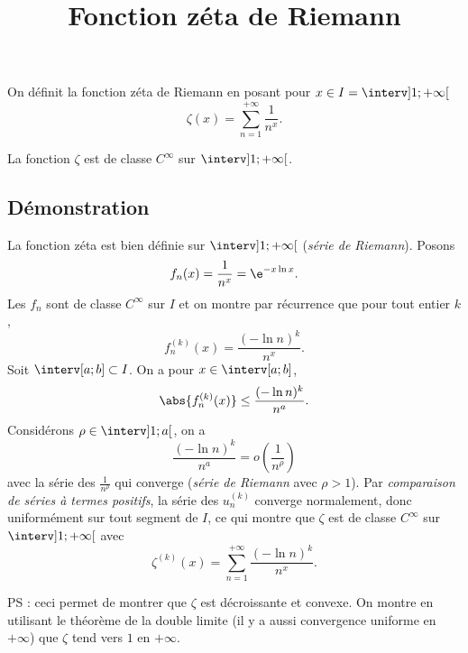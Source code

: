 \documentclass[fontsize=12pt,twoside=false,parskip=half, french]{scrartcl}
\title{Fonction zéta de Riemann}
\date{}
\author{}
\begin{document}
\maketitle
    On définit la fonction zéta de Riemann en posant pour $x \in I = \interv]1; +\infty[$
    \[
      \zeta(x) = \sum_{n = 1}^{+\infty} \frac{1}{n^x}.
    \]
   \begin{Theoreme}
      La fonction $\zeta$ est de classe $C^\infty$ sur $\interv]1; +\infty[$.
   \end{Theoreme}
   \subsection{Démonstration}
      La fonction zéta est bien définie sur $\interv]1; +\infty[$ (\emph{série de Riemann}). Posons
      \[
         f_n(x) = \frac{1}{n^x} = \e^{-x \ln x}.
      \]
      Les $f_n$ sont de classe $C^\infty$ sur $I$ et on montre par récurrence que pour tout entier $k$, 
      \[
         f_n^{(k)}(x) = \frac{(- \ln n)^k}{n^x}.
      \]
      Soit $\interv[a; b] \subset I$. On a pour $x \in \interv[a; b]$,
      \[
         \abs{f_n^{(k)}(x)} \leq \frac{(- \ln n)^k}{n^a}.
      \]
      Considérons $\rho \in \interv]1; a[$, on a
      \[
         \frac{(- \ln n)^k}{n^a}  = o\left(\frac{1}{n^\rho}\right)
      \]
      avec la série des $\frac{1}{n^\rho}$ qui converge (\emph{série de Riemann} avec $\rho > 1$). Par 
      \emph{comparaison de séries à termes positifs}, la série des $u_n^{(k)}$ converge normalement, donc uniformément
      sur tout segment de $I$, ce qui montre que $\zeta$ est de classe $C^\infty$ sur $\interv]1; +\infty[$ avec 
      \[
         \zeta^{(k)}(x) = \sum_{n = 1}^{+\infty} \frac{(- \ln n)^k}{n^x}.
      \]
      
      PS : ceci permet de montrer que $\zeta$ est décroissante et convexe. On montre en utilisant le théorème de la double
      limite (il y a aussi convergence uniforme en $+\infty$) que $\zeta$ tend vers $1$ en $+\infty$.
\end{document}
